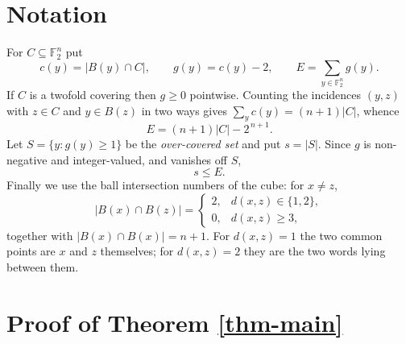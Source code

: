 \documentclass[10pt,a4paper]{article}
\begin{document}
\section{Notation}\label{sec-notation}

For $C\subseteq\mathbb{F}_2^n$ put
\[
  c(y)=|B(y)\cap C|,\qquad g(y)=c(y)-2,\qquad E=\sum_{y\in\mathbb{F}_2^n} g(y).
\]
If $C$ is a twofold covering then $g\ge 0$ pointwise. Counting the incidences
$(y,z)$ with $z\in C$ and $y\in B(z)$ in two ways gives
$\sum_y c(y)=(n+1)|C|$, whence
\begin{equation}\label{eq-excess}
  E=(n+1)|C|-2^{\,n+1}.
\end{equation}
Let $S=\{y: g(y)\ge 1\}$ be the \emph{over-covered set} and put $s=|S|$. Since
$g$ is non-negative and integer-valued, and vanishes off $S$,
\begin{equation}\label{eq-s-le-E}
  s\le E.
\end{equation}
Finally we use the ball intersection numbers of the cube: for $x\ne z$,
\begin{equation}\label{eq-ball-int}
  |B(x)\cap B(z)| =
  \begin{cases}
    2, & d(x,z)\in\{1,2\},\\
    0, & d(x,z)\ge 3,
  \end{cases}
\end{equation}
together with $|B(x)\cap B(x)|=n+1$. For $d(x,z)=1$ the two common points are
$x$ and $z$ themselves; for $d(x,z)=2$ they are the two words lying between
them.

\section{Proof of Theorem \ref{thm-main}}\label{sec-proof}
\end{document}
